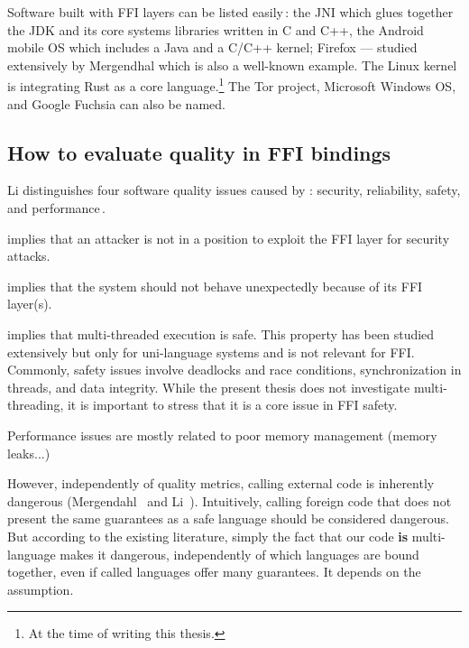 \documentclass[nomenclature, english, bibtex]{kththesis}
\begin{document}
Software built with FFI layers can be listed easily\,\cite{li_improving_2014,li_detecting_2022,mergendahl_cross-language_2022}: the \gls{JNI} which glues together the \gls{JDK} and its core systems libraries written in C and C++, the Android mobile \gls{OS} which includes a Java  and a C/C++ kernel; Firefox --- studied extensively by Mergendhal \etal which is also a well-known example. The Linux kernel is integrating Rust as a core language.\footnote{At the time of writing this thesis.} The Tor project, Microsoft Windows \gls{OS}, and Google Fuchsia can also be named.

\subsection{How to evaluate quality in FFI bindings}

Li distinguishes four software quality issues caused by : security, reliability, safety, and performance\,\cite{li_improving_2014}.

\begin{description}[labelwidth=\widthof{\textbf{Memory safety}}, leftmargin = !]
\item[\textbf{Security}] implies that an attacker is not in a position to exploit the FFI layer for security attacks. 
\item[\textbf{Reliability}]implies that the system should not behave unexpectedly because of its FFI layer(s).
\item[\textbf{Safety}] implies that multi-threaded execution is safe. This property has been studied extensively but only for uni-language systems and is not relevant for FFI. Commonly, safety issues involve deadlocks and race conditions, synchronization in threads, and data integrity. While the present thesis does not investigate multi-threading, it is important to stress that it is a core issue in FFI safety.
\item[\textbf{Performance}] Performance issues are mostly related to poor memory management (memory leaks...)
\end{description}

However, independently of quality metrics, calling external code is inherently dangerous (Mergendahl \etal\,\cite{mergendahl_cross-language_2022} and Li \etal\,\cite{li_detecting_2022}). Intuitively, calling foreign code that does not present the same guarantees as a safe language should be considered dangerous. But according to the existing literature, simply the fact that our code \textbf{is} multi-language makes it dangerous, independently of which languages are bound together, even if called languages offer many guarantees. It depends on the assumption.
\end{document}
